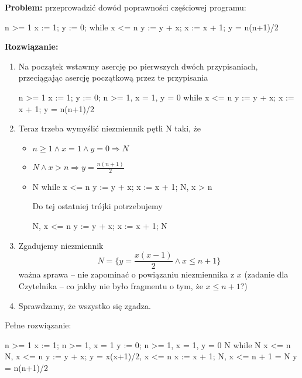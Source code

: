 \begin{example}
    \textbf{Problem:} przeprowadzić dowód poprawności częściowej programu:
    \begin{cpp}
        {n >= 1}
        x := 1; y := 0;
        while x <= n {
            y := y + x;
            x := x + 1;
        }
        {y = n(n+1)/2}
    \end{cpp}
    \textbf{Rozwiązanie:}
    \begin{enumerate}
        \item Na początek wstawmy asercję po pierwszych dwóch przypisaniach, przeciągając asercję początkową przez te przypisania
        \begin{cpp}
            {n >= 1}
            x := 1; y := 0;
            {n >= 1, x = 1, y = 0}
            while x <= n {
                y := y + x;
                x := x + 1;
            }
            {y = n(n+1)/2}
        \end{cpp}
        \item Teraz trzeba wymyślić niezmiennik pętli N taki, że
        \begin{itemize}
            \item $n \ge 1 \land x = 1 \land y = 0 \Longrightarrow N$
            \item $N \land x > n \Longrightarrow y = \frac{n(n+1)}{2}$
            \item \begin{cpp}
                {N}
                while x <= n {
                    y := y + x;
                    x := x + 1;
                }
                {N, x > n}
            \end{cpp}
        Do tej ostatniej trójki potrzebujemy
        \begin{cpp}
            {N, x <= n}
            y := y + x;
            x := x + 1;
            {N}
        \end{cpp}
        \end{itemize}
        \item Zgadujemy niezmiennik
        $$
        N = \{ y=\frac{x(x-1)}{2} \land x \le n+1 \}
        $$
        ważna sprawa -- nie zapominać o powiązaniu niezmiennika z $x$ (zadanie dla Czytelnika -- co jakby nie było fragmentu o tym, że $x\le n + 1$?)
        \item Sprawdzamy, że wszystko się zgadza.
    \end{enumerate}
    Pełne rozwiązanie:
    \begin{cpp}
        {n >= 1}
        x := 1;
        {n >= 1, x = 1}
        y := 0;
        {n >= 1, x = 1, y = 0}
        {N}
        while {N} x <= n {
            {N, x <= n}
            y := y + x;
            {y = x(x+1)/2, x <= n}
            x := x + 1;
            {N, x <= n + 1} = {N}
        }
        {y = n(n+1)/2}
    \end{cpp}
\end{example}
